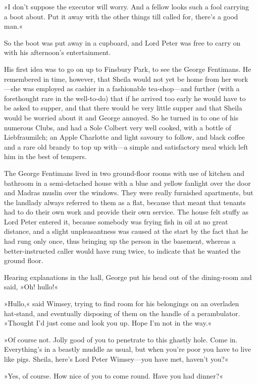 »I don't suppose the executor will worry. And a fellow looks such a fool carrying a boot about. Put it away with the other things till called for, there's a good man.«

So the boot was put away in a cupboard, and Lord Peter was free to carry on with his afternoon's entertainment.

His first idea was to go on up to Finsbury Park, to see the George Fentimans. He remembered in time, however, that Sheila would not yet be home from her work—she was employed as cashier in a fashionable tea-shop—and further (with a forethought rare in the well-to-do) that if he arrived too early he would have to be asked to supper, and that there would be very little supper and that Sheila would be worried about it and George annoyed. So he turned in to one of his numerous Clubs, and had a Sole Colbert very well cooked, with a bottle of Liebfraumilch; an Apple Charlotte and light savoury to follow, and black coffee and a rare old brandy to top up with—a simple and satisfactory meal which left him in the best of tempers.

The George Fentimans lived in two ground-floor rooms with use of kitchen and bathroom in a semi-detached house with a blue and yellow fanlight over the door and Madras muslin over the windows. They were really furnished apartments, but the landlady always referred to them as a flat, because that meant that tenants had to do their own work and provide their own service. The house felt stuffy as Lord Peter entered it, because somebody was frying fish in oil at no great distance, and a slight unpleasantness was caused at the start by the fact that he had rung only once, thus bringing up the person in the basement, whereas a better-instructed caller would have rung twice, to indicate that he wanted the ground floor.

Hearing explanations in the hall, George put his head out of the dining-room and said, »Oh! hullo!«

»Hullo,« said Wimsey, trying to find room for his belongings on an overladen hat-stand, and eventually disposing of them on the handle of a perambulator. »Thought I'd just come and look you up. Hope I'm not in the way.«

»Of course not. Jolly good of you to penetrate to this ghastly hole. Come in. Everything's in a beastly muddle as usual, but when you're poor you have to live like pigs. Sheila, here's Lord Peter Wimsey—you have met, haven't you?«

»Yes, of course. How nice of you to come round. Have you had dinner?«

